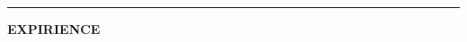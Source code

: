 \documentclass[10pt,A4]{article}
\newcommand{\cvsection}[2] {
\textcolor{sectcol}{\uppercase{\textbf{#1}}}
}
\newcommand{\cvsect}[4]{
	\textcolor{#3}{\hrule}
	\colorbox{#3}{ {\cvsection{#1}{#4}}}
}
\begin{document}
\newpage
\newcommand{\cvsecta}[1]{%
	\vspace{\baselineskip} %
	\colorbox{thirdcol}{\textcolor{white}{\MakeUppercase{\textbf{#1}}}}\\%
}

\setlength{\LTpre}{0pt} %
\setlength{\LTpost}{0pt} %

\setlength{\tabcolsep}{0pt} %

\newenvironment{entrylist}{
	\begin{longtable}[H]{l l}
}{
	\end{longtable}
}

\newcommand{\entry}[4]{%
	\parbox[t]{0.175\textwidth}{%
		\textcolor{thirdcol}{#1} %
	}%
	&\parbox[t]{0.825\textwidth}{%
		\textbf{\textcolor{thirdcol}{#2}}%
		\hfill%
		{\footnotesize \textbf{\textcolor{thirdcol}{#3}}}\\%
		\textcolor{thirdcol}{#4} %
	}\\\\}

\newcommand{\slashsep}{\hspace{3mm}/\hspace{3mm}}

\vfill

\cvsect{Expirience}{0.49}{thirdcol}{textcol}\\[20pt]
\end{document}
